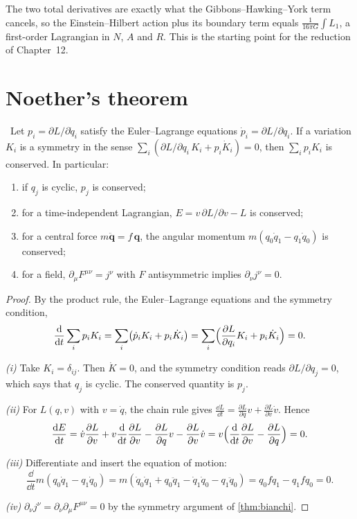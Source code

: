 The two total derivatives are exactly what the Gibbons--Hawking--York term cancels, so the Einstein--Hilbert action plus its boundary term equals $\frac1{16\pi G}\int L_1$, a first-order Lagrangian in $N$, $A$ and $R$. This is the starting point for the reduction of Chapter~12.

\section{Noether's theorem}

\begin{theorem}[Noether]\label{thm:noether}\ver\
Let $p_i=\partial L/\partial\dot q_i$ satisfy the Euler--Lagrange equations $\dot p_i=\partial L/\partial q_i$. If a variation $K_i$ is a symmetry in the sense $\sum_i(\partial L/\partial q_i\,K_i+p_i\dot K_i)=0$, then $\sum_ip_iK_i$ is conserved. In particular:
\begin{enumerate}[label=(\roman*)]
\item if $q_j$ is cyclic, $p_j$ is conserved;
\item for a time-independent Lagrangian, $E=v\,\partial L/\partial v-L$ is conserved;
\item for a central force $m\ddot{\mathbf q}=f\,\mathbf q$, the angular momentum $m(q_0\dot q_1-q_1\dot q_0)$ is conserved;
\item for a field, $\partial_\mu F^{\mu\nu}=j^\nu$ with $F$ antisymmetric implies $\partial_\nu j^\nu=0$.
\end{enumerate}
\end{theorem}
\begin{proof}
By the product rule, the Euler--Lagrange equations and the symmetry condition,
\[
\frac{\mathrm{d}}{\mathrm{d} t}\sum_ip_iK_i=\sum_i\bigl(\dot p_iK_i+p_i\dot K_i\bigr)=\sum_i\Bigl(\frac{\partial L}{\partial q_i}K_i+p_i\dot K_i\Bigr)=0 .
\]

\emph{(i)} Take $K_i=\delta_{ij}$. Then $\dot K=0$, and the symmetry condition reads $\partial L/\partial q_j=0$, which says that $q_j$ is cyclic. The conserved quantity is $p_j$.

\emph{(ii)} For $L(q,v)$ with $v=\dot q$, the chain rule gives $\frac{\dd L}{\dd t}=\frac{\partial L}{\partial q}v+\frac{\partial L}{\partial v}\dot v$. Hence
\[
\frac{\mathrm{d} E}{\mathrm{d} t}=\dot v\frac{\partial L}{\partial v}+v\frac{\mathrm{d}}{\mathrm{d} t}\frac{\partial L}{\partial v}-\frac{\partial L}{\partial q}v-\frac{\partial L}{\partial v}\dot v=v\Bigl(\frac{\mathrm{d}}{\mathrm{d} t}\frac{\partial L}{\partial v}-\frac{\partial L}{\partial q}\Bigr)=0 .
\]

\emph{(iii)} Differentiate and insert the equation of motion:
\[
\frac{\dd}{\dd t}m(q_0\dot q_1-q_1\dot q_0)=m(\dot q_0\dot q_1+q_0\ddot q_1-\dot q_1\dot q_0-q_1\ddot q_0)=q_0fq_1-q_1fq_0=0 .
\]

\emph{(iv)} $\partial_\nu j^\nu=\partial_\nu\partial_\mu F^{\mu\nu}=0$ by the symmetry argument of \cref{thm:bianchi}.
\end{proof}


